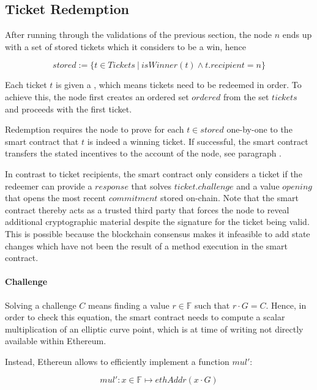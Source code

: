 \subsection{Ticket Redemption}
\label{sec:tickets:redemption}

After running through the validations of the previous section, the node $n$ ends up with a set of stored tickets which it considers to be a win, hence

$$ stored := \{ t \in Tickets \ | \ isWinner(t) \land t.recipient = n \}$$

Each ticket $t$ is given a  , which means tickets need to be redeemed in order. To achieve this, the node first creates an ordered set $ordered$ from the set $tickets$ and proceeds with the first ticket.

Redemption requires the node to prove for each $t \in stored$ one-by-one to the smart contract that $t$ is indeed a winning ticket. If successful, the smart contract transfers the stated incentives to the account of the node, see paragraph .

In contrast to ticket recipients, the smart contract only considers a ticket if the redeemer can provide a $response$ that solves $ticket.challenge$ and a value $opening$ that opens the most recent $commitment$ stored on-chain. Note that the smart contract thereby acts as a trusted third party that forces the node to reveal additional cryptographic material despite the signature for the ticket being valid. This is possible because the blockchain consensus makes it infeasible to add state changes which have not been the result of a method execution in the smart contract.

\paragraph{Challenge}
\label{sec:tickets:redemption:challenge}

Solving a challenge $C$ means finding a value $r \in \mathbb{F}$ such that $r \cdot G =C$. Hence, in order to check this equation, the smart contract needs to compute a scalar multiplication of an elliptic curve point, which is at time of writing not directly available within Ethereum.

Instead, Ethereun allows to efficiently implement a function $mul'$:

$$ mul': x \in \mathbb{F} \mapsto ethAddr (x \cdot G)$$

